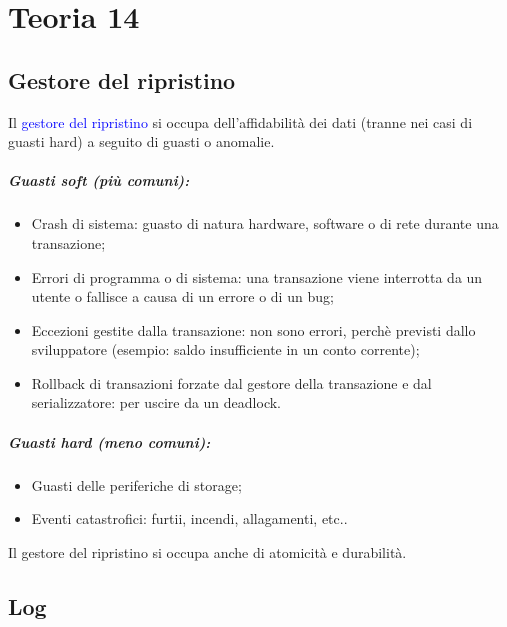 \chapter{Teoria 14}

\section{Gestore del ripristino}

Il \textcolor{blue}{gestore del ripristino} si occupa dell'affidabilità dei dati (tranne nei casi di guasti hard) a seguito di guasti o anomalie.

\paragraph{Guasti soft (più comuni):}

\begin{itemize}
    \item Crash di sistema: guasto di natura hardware, software o di rete durante una transazione;
    \item Errori di programma o di sistema: una transazione viene interrotta da un utente o fallisce a causa di un errore o di un bug;
    \item Eccezioni gestite dalla transazione: non sono errori, perchè previsti dallo sviluppatore (esempio: saldo insufficiente in un conto corrente);
    \item Rollback di transazioni forzate dal gestore della transazione e dal serializzatore: per uscire da un deadlock.
\end{itemize}

\paragraph{Guasti hard (meno comuni):}

\begin{itemize}
    \item Guasti delle periferiche di storage;
    \item Eventi catastrofici: furtii, incendi, allagamenti, etc..
\end{itemize}

Il gestore del ripristino si occupa anche di atomicità e durabilità.

\section{Log}

